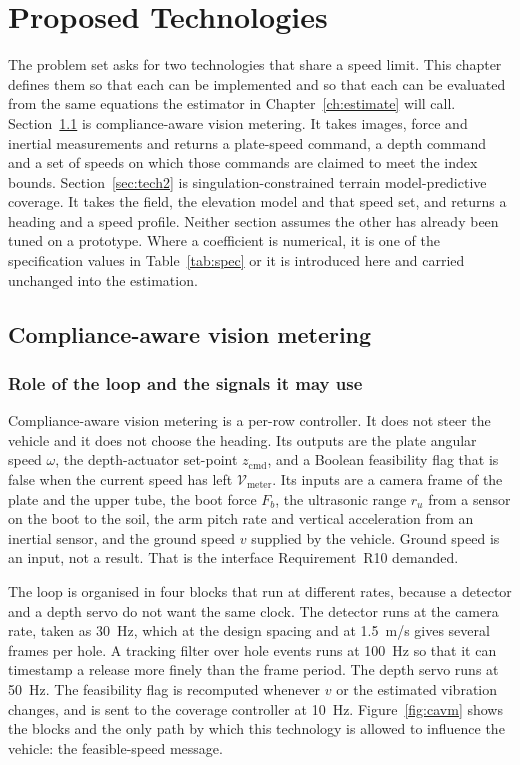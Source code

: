 \chapter{Proposed Technologies}
\label{ch:design}

The problem set asks for two technologies that share a speed limit. This chapter defines them so that each can be implemented and so that each can be evaluated from the same equations the estimator in Chapter~\ref{ch:estimate} will call. Section~\ref{sec:tech1} is compliance-aware vision metering. It takes images, force and inertial measurements and returns a plate-speed command, a depth command and a set of speeds on which those commands are claimed to meet the index bounds. Section~\ref{sec:tech2} is singulation-constrained terrain model-predictive coverage. It takes the field, the elevation model and that speed set, and returns a heading and a speed profile. Neither section assumes the other has already been tuned on a prototype. Where a coefficient is numerical, it is one of the specification values in Table~\ref{tab:spec} or it is introduced here and carried unchanged into the estimation.

\section{Compliance-aware vision metering}
\label{sec:tech1}

\subsection{Role of the loop and the signals it may use}

Compliance-aware vision metering is a per-row controller. It does not steer the vehicle and it does not choose the heading. Its outputs are the plate angular speed \(\omega\), the depth-actuator set-point \(z_{\mathrm{cmd}}\), and a Boolean feasibility flag that is false when the current speed has left \(\mathcal{V}_{\mathrm{meter}}\). Its inputs are a camera frame of the plate and the upper tube, the boot force \(F_b\), the ultrasonic range \(r_u\) from a sensor on the boot to the soil, the arm pitch rate and vertical acceleration from an inertial sensor, and the ground speed \(v\) supplied by the vehicle. Ground speed is an input, not a result. That is the interface Requirement~R10 demanded.

The loop is organised in four blocks that run at different rates, because a detector and a depth servo do not want the same clock. The detector runs at the camera rate, taken as \SI{30}{Hz}, which at the design spacing and at \SI{1.5}{m/s} gives several frames per hole. A tracking filter over hole events runs at \SI{100}{Hz} so that it can timestamp a release more finely than the frame period. The depth servo runs at \SI{50}{Hz}. The feasibility flag is recomputed whenever \(v\) or the estimated vibration changes, and is sent to the coverage controller at \SI{10}{Hz}. Figure~\ref{fig:cavm} shows the blocks and the only path by which this technology is allowed to influence the vehicle: the feasible-speed message.

